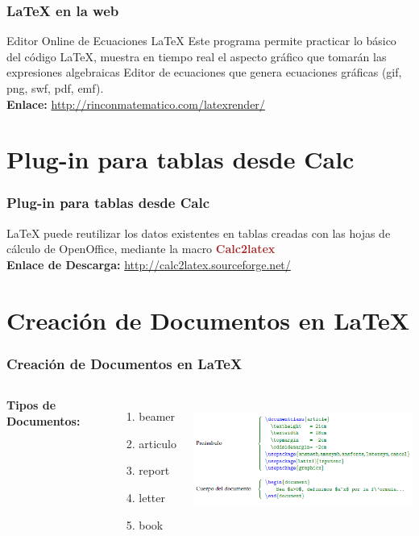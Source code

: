 \documentclass[sans serif,9pt,xcolor=dvipsnames]{beamer}%
\begin{document}
\begin{frame}
\frametitle {\LaTeX \hspace{0.2cm} en la web}

\begin{block}{Editor Online de Ecuaciones \LaTeX}
\justifying
Este programa permite practicar lo básico del código LaTeX, muestra en tiempo real el aspecto gráfico que tomarán las expresiones algebraicas
Editor de ecuaciones que genera ecuaciones gráficas (gif, png, swf, pdf, emf).\\
\textbf{Enlace: }\textcolor{blue}{\url{http://rinconmatematico.com/latexrender/}}
\end{block}

\end{frame}

\section{Plug-in para tablas desde Calc}
\begin{frame}
\frametitle {Plug-in para tablas desde Calc}
\justifying
LaTeX puede reutilizar los datos existentes en tablas creadas con las hojas de cálculo de OpenOffice, mediante la macro \textcolor{brown}{\textbf{ Calc2latex}}\\

\textbf{Enlace de Descarga: }\textcolor{blue}{\url{http://calc2latex.sourceforge.net/}}
\end{frame}

\section{Creación de Documentos en \LaTeX}
\begin{frame}
\frametitle {Creación de Documentos en \LaTeX}
\begin{center}
\begin{columns}
 \hspace{1 cm}

\textbf{Tipos de Documentos:}
\begin{enumerate}
\item beamer
\item articulo
\item report
\item letter
\item book
\end{enumerate}
\includegraphics[height=4cm]{imagenes/estDoc.PNG}  
\end{columns}
\end{center}

\end{frame}
\end{document}
